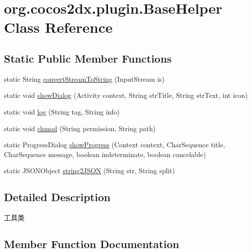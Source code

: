 \hypertarget{classorg_1_1cocos2dx_1_1plugin_1_1BaseHelper}{}\section{org.\+cocos2dx.\+plugin.\+Base\+Helper Class Reference}
\label{classorg_1_1cocos2dx_1_1plugin_1_1BaseHelper}
\subsection*{Static Public Member Functions}
\begin{DoxyCompactItemize}
\item 
static String \hyperlink{classorg_1_1cocos2dx_1_1plugin_1_1BaseHelper_a084a34eda2167831e8f49cde9e708f12}{convert\+Stream\+To\+String} (Input\+Stream is)
\item 
static void \hyperlink{classorg_1_1cocos2dx_1_1plugin_1_1BaseHelper_ac5afe3560ecc9ae2766e799e72b4da0a}{show\+Dialog} (Activity context, String str\+Title, String str\+Text, int icon)
\item 
static void \hyperlink{classorg_1_1cocos2dx_1_1plugin_1_1BaseHelper_a05a7a62d5acbf1da8dcb8ea9a5148e22}{log} (String tag, String info)
\item 
static void \hyperlink{classorg_1_1cocos2dx_1_1plugin_1_1BaseHelper_ae9cc15d2a6d611278d0b5d5f684cbd91}{chmod} (String permission, String path)
\item 
static Progress\+Dialog \hyperlink{classorg_1_1cocos2dx_1_1plugin_1_1BaseHelper_a6f2a47b5e3af9d426b3a774f94ebc8d5}{show\+Progress} (Context context, Char\+Sequence title, Char\+Sequence message, boolean indeterminate, boolean cancelable)
\item 
static J\+S\+O\+N\+Object \hyperlink{classorg_1_1cocos2dx_1_1plugin_1_1BaseHelper_ab34794067841f984bf7a32a1c99280f4}{string2\+J\+S\+ON} (String str, String split)
\end{DoxyCompactItemize}


\subsection{Detailed Description}
工具类 

\subsection{Member Function Documentation}
\mbox{\label{classorg_1_1cocos2dx_1_1plugin_1_1BaseHelper_ae9cc15d2a6d611278d0b5d5f684cbd91}} 
